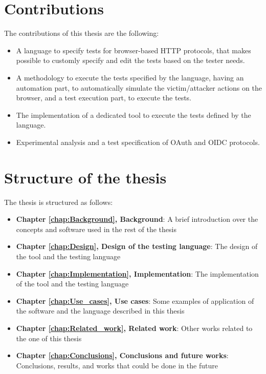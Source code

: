 \section{Contributions}
\label{sec:contributions}
The contributions of this thesis are the following:
\begin{itemize}
    \item A language to specify tests for browser-based HTTP protocols, that makes possible to customly specify and edit the tests based on the tester needs.
    \item A methodology to execute the tests specified by the language, having an automation part, to automatically simulate the victim/attacker actions on the browser, and a test execution part, to execute the tests.
    \item The implementation of a dedicated tool to execute the tests defined by the language.
    \item Experimental analysis and a test specification of \gls{OAuth} and \gls{OIDC} protocols.
\end{itemize}

\section{Structure of the thesis}
The thesis is structured as follows:
\begin{itemize}
    \item \textbf{Chapter \ref{chap:Background}, Background}: A brief introduction over the concepts and software used in the rest of the thesis
    \item \textbf{Chapter \ref{chap:Design}, Design of the testing language}: The design of the tool and the testing language
    \item \textbf{Chapter \ref{chap:Implementation}, Implementation}: The implementation of the tool and the testing language
    \item \textbf{Chapter \ref{chap:Use_cases}, Use cases}: Some examples of application of the software and the language described in this thesis
    \item \textbf{Chapter \ref{chap:Related_work}, Related work}: Other works related to the one of this thesis
    \item \textbf{Chapter \ref{chap:Conclusions}, Conclusions and future works}: Conclusions, results, and works that could be done in the future
\end{itemize}




